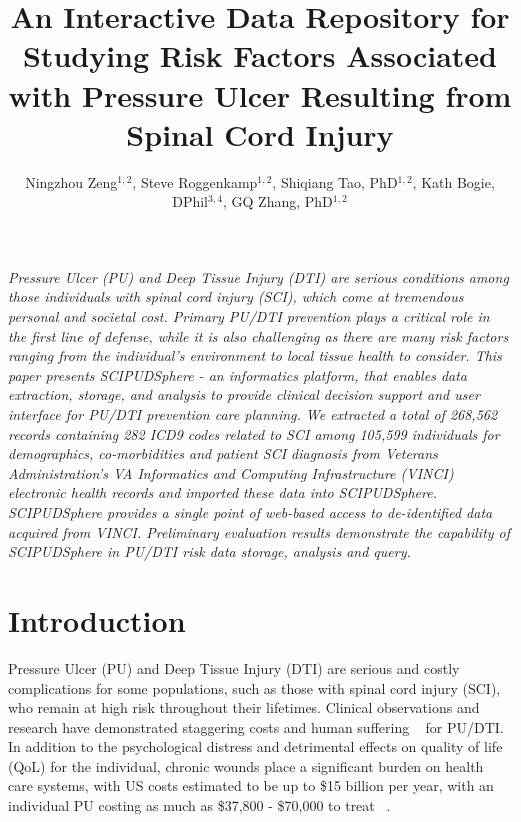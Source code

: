 \documentclass{amia}
\begin{document}
\title{An Interactive Data Repository for Studying Risk Factors Associated with Pressure Ulcer Resulting from Spinal Cord Injury}

\author{Ningzhou Zeng$^{1,2}$, Steve Roggenkamp$^{1,2}$, Shiqiang Tao, PhD$^{1,2}$, Kath Bogie, DPhil$^{3,4}$, GQ Zhang, PhD$^{1,2}$}


\maketitle


\textit{Pressure Ulcer (PU) and Deep Tissue Injury (DTI) are serious conditions among those individuals with spinal cord injury (SCI), which come at tremendous personal and societal cost. Primary PU/DTI prevention plays a critical role in the first line of defense, while it is also challenging as there are many risk factors ranging from the individual’s environment to local tissue health to consider. This paper presents SCIPUDSphere - an informatics platform, that enables data extraction, storage, and analysis to provide clinical decision support and user interface for PU/DTI prevention care planning. We extracted a total of 268,562 records containing 282 ICD9 codes related to SCI among 105,599 individuals for demographics, co-morbidities and patient SCI diagnosis from Veterans Administration's VA Informatics and Computing Infrastructure (VINCI) electronic health records and imported these data into SCIPUDSphere. SCIPUDSphere provides a single point of web-based access to de-identified data acquired from VINCI. Preliminary evaluation results demonstrate the capability of SCIPUDSphere in PU/DTI risk data storage, analysis and query.}

\section*{Introduction}
Pressure Ulcer (PU) and Deep Tissue Injury (DTI) are serious and costly complications for some populations, such as those with spinal cord injury (SCI), who remain at high risk throughout their lifetimes. Clinical observations and research have demonstrated staggering costs and human suffering ~\cite{ref1,ref2,ref3} for PU/DTI. In addition to the psychological distress and detrimental effects on quality of life (QoL) for the individual, chronic wounds place a significant burden on health care systems, with US costs estimated to be up to \$15 billion per year, with an individual PU costing as much as \$37,800 - \$70,000 to treat  ~\cite{ref4,ref5,ref6}.
\end{document}
